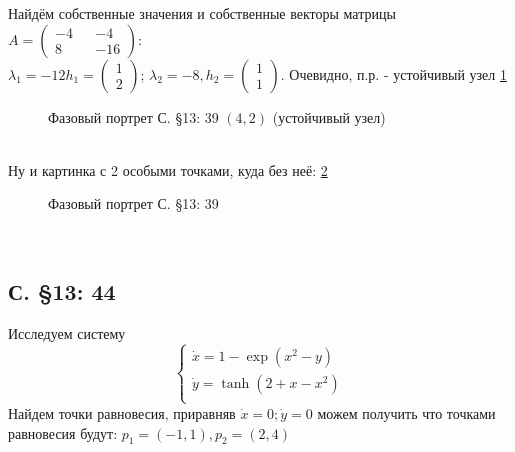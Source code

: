 \documentclass{article}
\begin{document}
Найдём собственные значения и собственные векторы матрицы $A=\begin{pmatrix} -4 && -4 \\ 8 && -16 \end{pmatrix}$:\\
 $\lambda_1=-12
 h_1 = \begin{pmatrix} 1 \\  2 \end{pmatrix} $; 
 $\lambda_2= -8,
 h_2 = \begin{pmatrix} 1 \\  1 \end{pmatrix} $. 
 Очевидно, п.р. - устойчивый узел \ref{13.39.2}
 \begin{figure}[ht]
\caption{Фазовый портрет С. \S13: 39 $(4,2)$ (устойчивый узел)}
\label{13.39.2}
\end{figure}\\  
Ну и картинка с 2 особыми точками, куда без неё: \ref{13.39.3}\\
 \begin{figure}[ht]
\caption{Фазовый портрет С. \S13: 39}
\label{13.39.3}
\end{figure}\\

\subsection{С. \S13: 44}
Исследуем систему 
\begin{equation}
\begin{cases}
        \dot{x}=1-\exp{(x^2-y)}\\
        \dot{y}=\tanh{(2+x-x^2)}\\
    \end{cases}    
\end{equation}
Найдем точки равновесия, приравняв $\dot{x}=0; \dot{y}=0$ можем получить что точками равновесия будут: $p_1=(-1,1), p_2=(2,4)$\\
\end{document}

